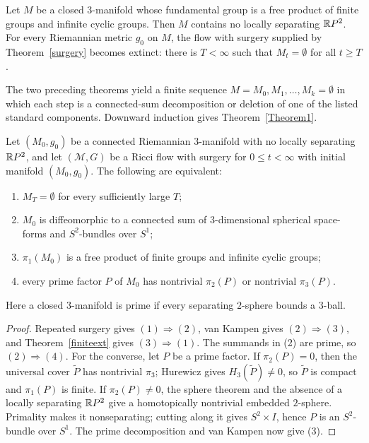 \begin{theorem}
\label{thm:ricci-flow-surgery-finite-extinction}

\label{finiteext}
Let $M$ be a closed $3$-manifold whose fundamental group is a free product of
finite groups and infinite cyclic groups. Then $M$ contains no locally
separating $\mathbb{R} P^2$. For every Riemannian metric $g_0$ on $M$, the flow with
surgery supplied by Theorem~\ref{surgery} becomes extinct: there is $T<\infty$
such that $M_t=\emptyset$ for all $t\geq T$.
\end{theorem}

The two preceding theorems yield a finite sequence
$M=M_0,M_1,\ldots,M_k=\emptyset$ in which each step is a connected-sum
decomposition or deletion of one of the listed standard components. Downward
induction gives Theorem~\ref{Theorem1}.

\begin{corollary}
\label{cor:extinction-equivalence}
\label{corequiv}
Let $(M_0,g_0)$ be a connected Riemannian $3$-manifold with no locally
separating $\mathbb{R} P^2$, and let $({\mathcal M},G)$ be a Ricci flow with surgery
for $0\leq t<\infty$ with initial manifold $(M_0,g_0)$. The following are
equivalent:
\begin{enumerate}
\item[(1)] $M_T=\emptyset$ for every sufficiently large $T$;
\item[(2)] $M_0$ is diffeomorphic to a connected sum of $3$-dimensional
spherical space-forms and $S^2$-bundles over $S^1$;
\item[(3)] $\pi_1(M_0)$ is a free product of finite groups and infinite cyclic
groups;
\item[(4)] every prime factor $P$ of $M_0$ has nontrivial $\pi_2(P)$ or
nontrivial $\pi_3(P)$.
\end{enumerate}
Here a closed $3$-manifold is prime if every separating $2$-sphere bounds a
$3$-ball.
\end{corollary}

\begin{proof}
\sketch
{}
Repeated surgery gives $(1)\Rightarrow(2)$, van Kampen gives
$(2)\Rightarrow(3)$, and Theorem~\ref{finiteext} gives
$(3)\Rightarrow(1)$. The summands in (2) are prime, so
$(2)\Rightarrow(4)$. For the converse, let $P$ be a prime factor. If
$\pi_2(P)=0$, then the universal cover $\widetilde P$ has nontrivial
$\pi_3$; Hurewicz gives $H_3(\widetilde P)\neq0$, so $\widetilde P$ is compact
and $\pi_1(P)$ is finite. If $\pi_2(P)\neq0$, the sphere theorem and the
absence of a locally separating $\mathbb{R} P^2$ give a homotopically nontrivial
embedded $2$-sphere. Primality makes it nonseparating; cutting along it gives
$S^2\times I$, hence $P$ is an $S^2$-bundle over $S^1$. The prime
decomposition and van Kampen now give (3).
\end{proof}

